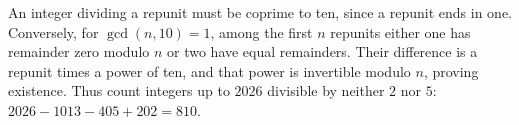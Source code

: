 An integer dividing a repunit must be coprime to ten, since a repunit ends in one. Conversely, for $\gcd(n,10)=1$, among the first $n$ repunits either one has remainder zero modulo $n$ or two have equal remainders. Their difference is a repunit times a power of ten, and that power is invertible modulo $n$, proving existence. Thus count integers up to $2026$ divisible by neither $2$ nor $5$: $2026-1013-405+202=\boxed{810}$.
